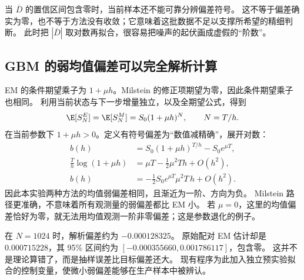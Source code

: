 当 $\overline D$ 的置信区间包含零时，当前样本还不能可靠分辨偏差符号。
这不等于偏差确实为零，也不等于方法没有收敛；它意味着这批数据不足以支撑所希望的精细判断。
此时把 $|\overline D|$ 取对数再拟合，很容易把噪声的起伏画成虚假的“阶数”。

\subsection{GBM 的弱均值偏差可以完全解析计算}
EM 的条件期望乘子为 $1+\mu h$。Milstein 的修正项期望为零，因此条件期望乘子也相同。
利用当前状态与下一步增量独立，以及全期望公式，得到
\begin{equation}\label{eq:errors-discrete-mean}
 \E[S_N^{E}]=\E[S_N^{M}]=S_0(1+\mu h)^N,\qquad N=T/h.
\end{equation}
在当前参数下 $1+\mu h>0$。定义有符号偏差为“数值减精确”，展开对数：
\begin{align}
 b(h)&=S_0(1+\mu h)^{T/h}-S_0e^{\mu T},\label{eq:errors-bias-exact}\\
 \frac{T}{h}\log(1+\mu h)&=\mu T-\frac12\mu^2Th+O(h^2),\label{eq:errors-bias-log}\\
 b(h)&=-\frac12S_0e^{\mu T}\mu^2T\,h+O(h^2).\label{eq:errors-bias-order}
\end{align}
因此本实验两种方法的均值弱偏差相同，且渐近为一阶、方向为负。
Milstein 路径更准确，不意味着所有观测量的弱偏差都比 EM 小。
若 $\mu=0$，这里的均值偏差恰好为零，就无法用均值观测一阶非零偏差；这是参数退化的例子。

在 $N=1024$ 时，解析偏差约为 $-0.000128325$。
原始配对 EM 估计却是 $0.000715228$，其 95\% 区间约为 $[-0.000355660,0.001786117]$，包含零。
这并不是理论算错了，而是抽样误差比目标偏差还大。
现有程序为此加入独立预实验拟合的控制变量，使微小弱偏差能够在生产样本中被辨认。

